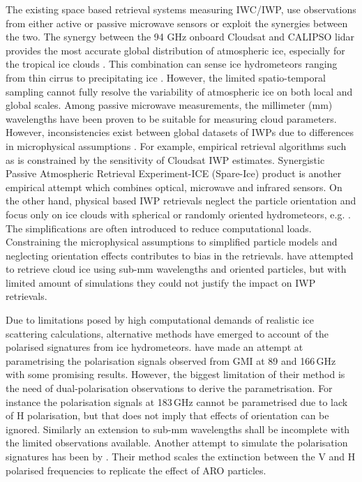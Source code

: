\documentclass[amt, manuscript]{copernicus}
\begin{document}
The existing space based retrieval systems measuring IWC/IWP, use observations from either active or passive microwave sensors or exploit the synergies between the two. The synergy between the 94\,\,GHz  onboard Cloudsat and CALIPSO lidar provides the most accurate global distribution of atmospheric ice, especially for the tropical ice clouds \citep{protat:theev:10}. This combination can sense ice hydrometeors ranging from thin cirrus to precipitating ice \citep{stephens:cloud:18}. However, the limited spatio-temporal sampling cannot fully resolve the  variability of atmospheric ice on both local and global scales. Among passive microwave measurements, the millimeter (mm) wavelengths have been proven to be suitable for measuring cloud parameters. However, inconsistencies exist between global datasets of IWPs due to differences in microphysical assumptions \citep{duncan:anupd:18}. For example, empirical retrieval algorithms such as \citet{gong:cloud:14} is constrained by the sensitivity of Cloudsat IWP estimates. Synergistic Passive Atmospheric Retrieval Experiment-ICE (Spare-Ice) product \citep{holl:spare:14} is another empirical attempt which combines optical, microwave and infrared sensors. On the other hand, physical based IWP retrievals neglect the particle orientation and focus only on ice clouds with spherical or randomly oriented hydrometeors, e.g. \citet{evans:icecl:05, Zhao:retri:02}. The simplifications are often introduced to reduce computational loads. Constraining the microphysical assumptions to simplified particle models and neglecting orientation effects contributes to bias in the retrievals. \citet{jimenez:2007:perfo} have attempted to retrieve cloud ice using sub-mm wavelengths and oriented particles, but with limited amount of simulations they could not justify the impact on IWP retrievals.  
	
Due to limitations posed by high computational demands of realistic ice scattering calculations, alternative methods have emerged to account of the polarised signatures from ice hydrometeors. \citet{galligani:param:21} have made an attempt at  parametrising the polarisation signals observed from GMI at 89 and 166\,GHz with some promising results. However, the biggest limitation of their method is the need of dual-polarisation observations to derive the parametrisation. For instance the polarisation signals at 183\,GHz cannot be parametrised due to lack of H polarisation, but that does not imply that effects of orientation can be ignored. Similarly an extension to sub-mm wavelengths shall be incomplete with the limited observations available. Another attempt to simulate the polarisation signatures has been by \citet{barlakas:intro:21}. Their method scales the extinction between the V and H polarised frequencies to replicate the effect of ARO particles.
 
\end{document}
